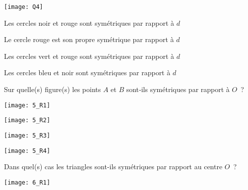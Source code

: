 \begin{QCM}
  \begin{GroupeQCM}

      \begin{exercice}
      \begin{center} \texttt{[image: Q4]} \end{center}
      \begin{ChoixQCM}{4}
      \item Les cercles noir et rouge sont symétriques par rapport à $d$
      \item Le cercle rouge est son propre symétrique par rapport à $d$
      \item Les cercles vert et rouge sont symétriques par rapport à $d$
      \item Les cercles bleu et noir sont symétriques par rapport à $d$
      \end{ChoixQCM}
\begin{corrige}
   \end{corrige}
    \end{exercice}

  
  \begin{exercice}
      Sur quelle(s) figure(s) les points $A$ et $B$ sont‑ils symétriques par rapport à $O$ ?
      \begin{ChoixQCM}{4}
      \item 
      
      \texttt{[image: 5\_R1]}
      \item 
      
      \texttt{[image: 5\_R2]}
      \item 
      
      \texttt{[image: 5\_R3]}
      \item 
      
      \texttt{[image: 5\_R4]}
      \end{ChoixQCM}
\begin{corrige}
   \end{corrige}
    \end{exercice}
    
    
    \begin{exercice}
      Dans quel(s) cas les triangles sont-ils symétriques par rapport au centre $O$ ?
      \begin{ChoixQCM}{4}
      \item 
      
      \texttt{[image: 6\_R1]}
      \item 
      

\end{ChoixQCM}
\end{exercice}
\end{GroupeQCM}
\end{QCM}
